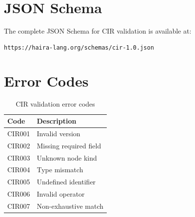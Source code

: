 \section{JSON Schema}

The complete JSON Schema for CIR validation is available at:

\begin{lstlisting}[language=bash,numbers=none]
https://haira-lang.org/schemas/cir-1.0.json
\end{lstlisting}

\section{Error Codes}

\begin{table}[h]
\centering
\begin{tabular}{ll}
\toprule
\textbf{Code} & \textbf{Description} \\
\midrule
CIR001 & Invalid version \\
CIR002 & Missing required field \\
CIR003 & Unknown node kind \\
CIR004 & Type mismatch \\
CIR005 & Undefined identifier \\
CIR006 & Invalid operator \\
CIR007 & Non-exhaustive match \\
\bottomrule
\end{tabular}
\caption{CIR validation error codes}
\end{table}
